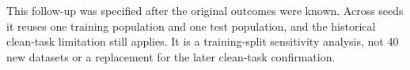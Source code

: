 This follow-up was specified after the original outcomes were known. Across
seeds it reuses one training population and one test population, and the
historical clean-task limitation still applies. It is a training-split
sensitivity analysis, not 40 new datasets or a replacement for the later
clean-task confirmation.
